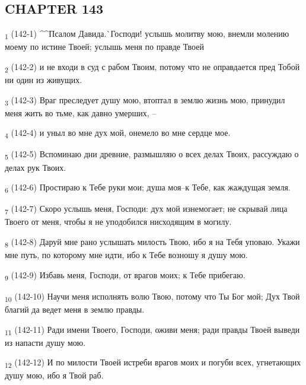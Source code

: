 \subsection{CHAPTER 143}
\begin{tcolorbox}
\textsubscript{1} (142-1) ^^Псалом Давида.^^ Господи! услышь молитву мою, внемли молению моему по истине Твоей; услышь меня по правде Твоей
\end{tcolorbox}
\begin{tcolorbox}
\textsubscript{2} (142-2) и не входи в суд с рабом Твоим, потому что не оправдается пред Тобой ни один из живущих.
\end{tcolorbox}
\begin{tcolorbox}
\textsubscript{3} (142-3) Враг преследует душу мою, втоптал в землю жизнь мою, принудил меня жить во тьме, как давно умерших, --
\end{tcolorbox}
\begin{tcolorbox}
\textsubscript{4} (142-4) и уныл во мне дух мой, онемело во мне сердце мое.
\end{tcolorbox}
\begin{tcolorbox}
\textsubscript{5} (142-5) Вспоминаю дни древние, размышляю о всех делах Твоих, рассуждаю о делах рук Твоих.
\end{tcolorbox}
\begin{tcolorbox}
\textsubscript{6} (142-6) Простираю к Тебе руки мои; душа моя--к Тебе, как жаждущая земля.
\end{tcolorbox}
\begin{tcolorbox}
\textsubscript{7} (142-7) Скоро услышь меня, Господи: дух мой изнемогает; не скрывай лица Твоего от меня, чтобы я не уподобился нисходящим в могилу.
\end{tcolorbox}
\begin{tcolorbox}
\textsubscript{8} (142-8) Даруй мне рано услышать милость Твою, ибо я на Тебя уповаю. Укажи мне путь, по которому мне идти, ибо к Тебе возношу я душу мою.
\end{tcolorbox}
\begin{tcolorbox}
\textsubscript{9} (142-9) Избавь меня, Господи, от врагов моих; к Тебе прибегаю.
\end{tcolorbox}
\begin{tcolorbox}
\textsubscript{10} (142-10) Научи меня исполнять волю Твою, потому что Ты Бог мой; Дух Твой благий да ведет меня в землю правды.
\end{tcolorbox}
\begin{tcolorbox}
\textsubscript{11} (142-11) Ради имени Твоего, Господи, оживи меня; ради правды Твоей выведи из напасти душу мою.
\end{tcolorbox}
\begin{tcolorbox}
\textsubscript{12} (142-12) И по милости Твоей истреби врагов моих и погуби всех, угнетающих душу мою, ибо я Твой раб.
\end{tcolorbox}
